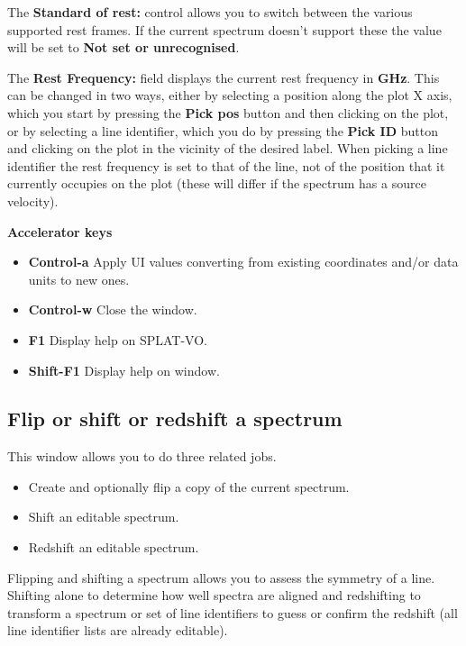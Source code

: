 \documentclass[twoside,11pt,nolof]{starlink}
\providecommand{\SPLAT}{\textsf{SPLAT-VO}}
\newcommand{\labelitem}[1]{\textbf{#1}}
\providecommand{\subheading}[1]{\textbf{\large{#1}}}
\begin{document}
The \labelitem{Standard of rest:} control allows you to switch between
the various supported rest frames. If the current spectrum doesn't support
these the value will be set to \labelitem{Not set or unrecognised}.

The \labelitem{Rest Frequency:} field displays the current rest frequency in
\labelitem{GHz}. This can be changed in two ways, either by selecting a
position along the plot X axis, which you start by pressing the
\labelitem{Pick pos} button and then clicking on the plot, or by selecting a
line identifier, which you do by pressing the \labelitem{Pick ID} button and
clicking on the plot in the vicinity of the desired label. When picking
a line identifier the rest frequency is set to that of the line, not of the
position that it currently occupies on the plot (these will differ if
the spectrum has a source velocity).

\subheading{Accelerator keys}

\begin{itemize}
\item \labelitem{Control-a} Apply UI values converting from existing
coordinates and/or data units to new ones.

\item \labelitem{Control-w} Close the window.
\item \labelitem{F1} Display help on \SPLAT.
\item \labelitem{Shift-F1} Display help on window.
\end{itemize}


\newpage
\subsection{Flip or shift or redshift a spectrum}

This window allows you to do three related jobs.
\begin{itemize}
\item Create and optionally flip a copy of the current spectrum.
\item Shift an editable spectrum.
\item Redshift an editable spectrum.
\end{itemize}

Flipping and shifting a spectrum allows you to assess the symmetry of a
line. Shifting alone to determine how well spectra are aligned and redshifting
to transform a spectrum or set of line identifiers to guess or confirm the
redshift (all line identifier lists are already editable).
\end{document}
